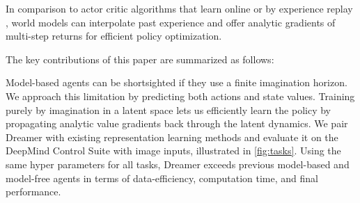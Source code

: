 In comparison to actor critic algorithms that learn online or by experience replay \citep{lillicrap2015ddpg,mnih2016a3c,schulman2017ppo,haarnoja2018sac,lee2019slac}, world models can interpolate past experience and offer analytic gradients of multi-step returns for efficient policy optimization.

\pagebreak

The key contributions of this paper are summarized as follows:
\endgroup
\begin{itemize}
 Model-based agents can be shortsighted if they use a finite imagination horizon. We approach this limitation by predicting both actions and state values. Training purely by imagination in a latent space lets us efficiently learn the policy by propagating analytic value gradients back through the latent dynamics.
 We pair Dreamer with existing representation learning methods and evaluate it on the DeepMind Control Suite with image inputs, illustrated in \cref{fig:tasks}. Using the same hyper parameters for all tasks, Dreamer exceeds previous model-based and model-free agents in terms of data-efficiency, computation time, and final performance.
\end{itemize}
